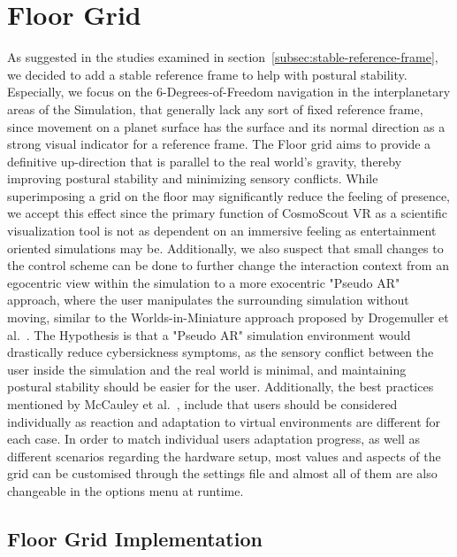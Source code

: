 \section{Floor Grid}\label{sec:floor-grid}

As suggested in the studies examined in section~\ref{subsec:stable-reference-frame}, we decided to add a stable
reference frame to help with postural stability.
Especially, we focus on the 6-Degrees-of-Freedom navigation in the interplanetary areas of the Simulation, that
generally lack any sort of fixed reference frame, since movement on a planet surface has the surface and its normal
direction as a strong visual indicator for a reference frame.
The Floor grid aims to provide a definitive up-direction that is parallel to the real world's gravity, thereby
improving postural stability and minimizing sensory conflicts.
While superimposing a grid on the floor may significantly reduce the feeling of presence, we accept this effect since
the primary function of CosmoScout VR as a scientific visualization tool is not as dependent on an immersive feeling
as entertainment oriented simulations may be.
Additionally, we also suspect that small changes to the control scheme can be done to further change the interaction
context from an egocentric view within the simulation to a more exocentric "Pseudo AR" approach, where the user
manipulates the surrounding simulation without moving, similar to the Worlds-in-Miniature approach proposed
by Drogemuller et al.~\cite{Drogemuller2020}.
The Hypothesis is that a "Pseudo AR" simulation environment would drastically reduce cybersickness symptoms, as the
sensory conflict between the user inside the simulation and the real world is minimal, and maintaining postural
stability should be easier for the user.
Additionally, the best practices mentioned by McCauley et al.~\cite{McCauley1992}, include that users should be
considered
individually as reaction and adaptation to virtual environments are different for each case.
In order to match individual users adaptation progress, as well as different scenarios regarding the hardware setup,
most values and aspects of the grid can be customised through the settings file and almost all of them are also
changeable in the options menu at runtime.

\subsection{Floor Grid Implementation}\label{subsec:floor-grid-implementation}

